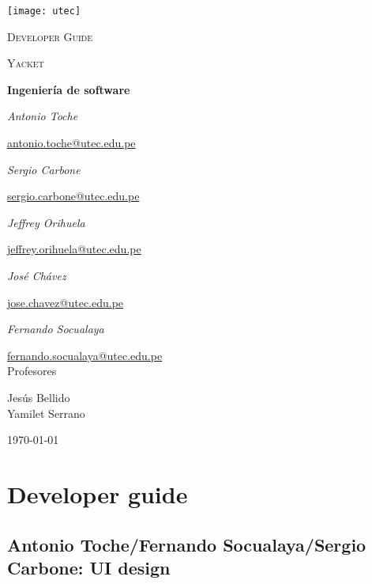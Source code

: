\documentclass{article}
\begin{document}
\begin{titlepage}
	\centering
	\texttt{[image: utec]}\par\vspace{1cm}
	{\scshape\LARGE Developer Guide \par}
	\vspace{0.5cm}
	{\scshape\Large Yacket\par}
	\vspace{0.5cm}
	{\huge\bfseries Ingeniería de software\par}
	\vspace{1.0cm}
	{\Large\itshape Antonio Toche\par}
	\href{mailto:antonio.toche@utec.edu.pe}{antonio.toche@utec.edu.pe}\\
	\vspace{1.0cm}
	{\Large\itshape Sergio Carbone\par}
	\href{mailto:sergio.carbone@utec.edu.pe}{sergio.carbone@utec.edu.pe}\\
	\vspace{1.0cm}
	{\Large\itshape Jeffrey Orihuela\par}
	\href{mailto:sergio.carbone@utec.edu.pe}{jeffrey.orihuela@utec.edu.pe}\\
	\vspace{1.0cm}
	{\Large\itshape José Chávez\par}
	\href{mailto:jose.chavez@utec.edu.pe}{jose.chavez@utec.edu.pe}\\
	\vspace{1.0cm}
	{\Large\itshape Fernando Socualaya\par}
	\href{mailto:fernando.socualaya@utec.edu.pe}{fernando.socualaya@utec.edu.pe}\\
	\vspace{1.0cm}
	\vfill
	Profesores\par
	Jesús Bellido\\
	Yamilet Serrano\\
	\vfill
	{\large \today\par}
\end{titlepage}

\section{Developer guide}
 \subsection{Antonio Toche/Fernando Socualaya/Sergio Carbone: UI design}
 \blindtext
\end{document}
